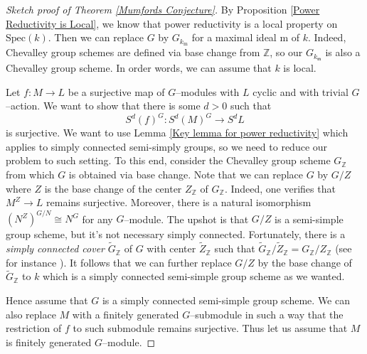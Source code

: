 \documentclass{article}
\theoremstyle{plain}
\theoremstyle{definition}
\begin{document}
\begin{proof}[Sketch proof of Theorem \ref{Mumfords Conjecture}]
    By Proposition \ref{Power Reductivity is Local}, we know that power reductivity is a local property on $\mathrm{Spec}(k)$. Then we can replace $G$ by $G_{k_\mathrm{m}}$ for a maximal ideal $\mathrm{m}$ of $k$. Indeed, Chevalley group schemes are defined via base change from $\mathbb Z$, so our $G_{k_\mathfrak{m}}$ is also a Chevalley group scheme. In order words, we can assume that $k$ is local. 

    Let $f\colon M\to L$ be a surjective map of $G$--modules with $L$ cyclic and with trivial $G$--action. We want to show that there is some $d>0$ such that 
    \[
    S^d(f)^G\colon S^d(M)^G \to S^d L
    \]
    is surjective. We want to use Lemma \ref{Key lemma for power reductivity} which applies to simply connected semi-simply groups, so we need to reduce our problem to such setting.  To this end, consider the Chevalley group scheme $G_\mathbb{Z}$ from which $G$ is obtained via base change. Note that we can replace $G$ by $G/Z$ where $Z$ is the base change of the center $Z_\mathbb{Z}$ of $G_\mathbb{Z}$. Indeed, one verifies that $M^Z \to L$ remains surjective. Moreover, there is a natural isomorphism $(N^Z)^{G/N}\cong N^G$ for any $G$--module. The upshot is that $G/Z$ is a semi-simple group scheme, but it's not necessary simply connected. Fortunately, there is a \textit{simply connected cover} $\widetilde{G}_\mathbb{Z}$ of $G$ with center $\widetilde{Z}_\mathbb{Z}$ such that $\widetilde{G}_\mathbb{Z}/\widetilde{Z}_\mathbb{Z}= G_\mathbb{Z}/Z_\mathbb{Z}$ (see for instance \cite[Ex, 6.5.2]{ConradReductive}). It follows that we can further replace $G/Z$ by the base change of $\widetilde{G}_\mathbb{Z}$ to $k$ which is a simply connected semi-simple group scheme as we wanted. 

    Hence assume that $G$ is a simply connected semi-simple group scheme. We can also replace $M$ with a finitely generated $G$--submodule in such a way that the restriction of $f$ to such submodule remains surjective. Thus let us assume that $M$ is finitely generated $G$--module.  
    

\end{proof}
\end{document}
